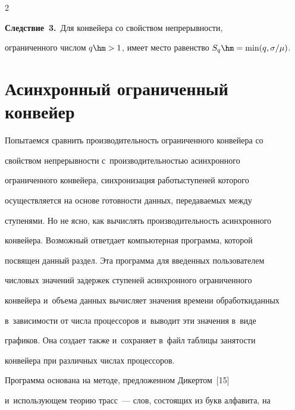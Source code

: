 \begin{multicols}{2}
  \smallskip


  


  \noindent


  \textbf{Следствие~3.}\ Для конвейера со свойством непрерывности, 


ограниченного числом $q\hm>1$, имеет место равенство $S_q\hm=\min 


(q,\sigma/\mu)$.


    


\section{Асинхронный ограниченный конвейер}





  Попытаемся сравнить производительность огра\-ни\-чен\-но\-го конвейера со 


свойством непрерывности с~производительностью асинхронного 


ограниченного конвейера, синхронизация работы\linebreak ступеней которого 


осуществляется на основе го\-тов\-ности данных, передаваемых между 


ступенями. Но не ясно, как вычислять производительность асинхронного 


конвейера. Возможный ответ\linebreak дает компьютерная программа, которой 


посвящен данный раздел. Эта программа для введенных пользователем 


числовых значений задержек ступеней асинхронного ограниченного 


конвейера и~объема данных вычисляет значения времени обработки\linebreak данных 


в~зависимости от чис\-ла процессоров и~выводит эти значения в~виде 


графиков. Она создает также и~сохраняет в~файл таб\-ли\-цы за\-ня\-тости 


конвейера при различных чис\-лах процессоров.


  


  Программа основана на методе, предложенном Дикертом~[15] 


и~использующем теорию трасс~--- слов, состоящих из букв алфавита, на 



\end{multicols}
